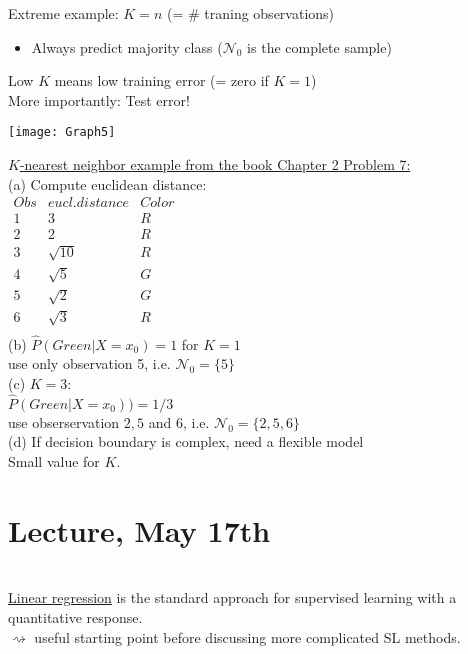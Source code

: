 \documentclass[11pt,a4paper,numbers=endperiod]{scrartcl}
\newcommand{\id}{\hspace*{4mm}}
\newcommand{\tit}[1]{\begin{large} \underline{\text{#1}}\end{large}}
\begin{document}
Extreme example: $K = n$ (= \# traning observations) \begin{itemize}[label={--}]
	\item Always predict majority class ($\mathcal{N}_0$ is the complete sample)
\end{itemize}

Low $K$ means low training error (= zero if $K = 1$)\\
More importantly: Test error! 
\begin{center}
	\texttt{[image: Graph5]}
\end{center}
\underline{$K$-nearest neighbor example from the book Chapter 2 Problem 7:}\\

(a) Compute euclidean distance:\\ $\begin{matrix}
	Obs & eucl. distance & Color\\
	1 & 3 & R\\
	2 & 2 & R\\
	3 & \sqrt{10} & R\\
	4 & \sqrt{5} & G\\
	5 & \sqrt{2} & G\\
	6 & \sqrt{3} & R\\
\end{matrix}$\\

(b) $\hat{P}(Green| X = x_0) = 1$ for $K = 1$\\
	use only observation 5, i.e. $\mathcal{N}_0 = \{5\}$\\
	
(c) $K = 3:$\\
	$\hat{P}(Green| X = x_0) ) = 1/3$\\
	use obserservation $2,5$ and $6$, i.e. $\mathcal{N}_0 = \{2,5,6\}$\\

(d) If decision boundary is complex, need a flexible model\\
	 Small value for $K$.\\
 
\section{Lecture, May 17th}

\tit{\textbf{Linear regression}}\\

\underline{Linear regression} is the standard approach for supervised learning with a quantitative response.\\
\id $\rightsquigarrow$ useful starting point before discussing more complicated SL methods.\\
\end{document}
